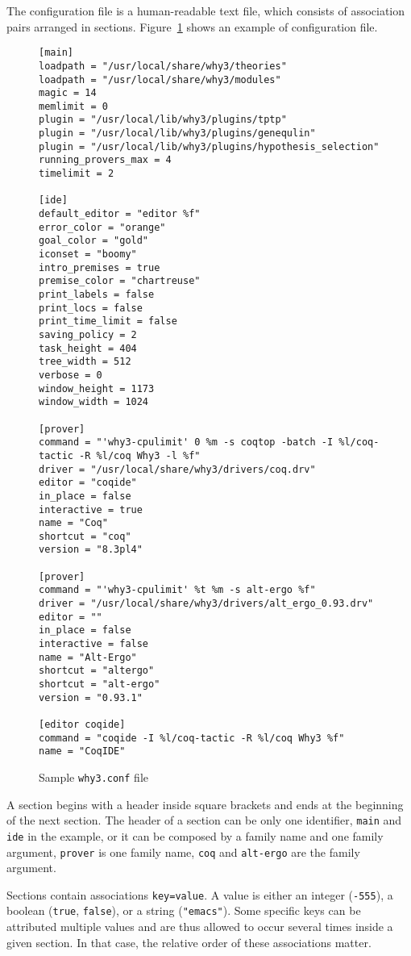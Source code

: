 The configuration file is a human-readable text file, which consists
of association pairs arranged in sections.
Figure~\ref{fig:why3conf} shows an example of configuration file.

\begin{figure}[p]
{\footnotesize
\begin{verbatim}
[main]
loadpath = "/usr/local/share/why3/theories"
loadpath = "/usr/local/share/why3/modules"
magic = 14
memlimit = 0
plugin = "/usr/local/lib/why3/plugins/tptp"
plugin = "/usr/local/lib/why3/plugins/genequlin"
plugin = "/usr/local/lib/why3/plugins/hypothesis_selection"
running_provers_max = 4
timelimit = 2

[ide]
default_editor = "editor %f"
error_color = "orange"
goal_color = "gold"
iconset = "boomy"
intro_premises = true
premise_color = "chartreuse"
print_labels = false
print_locs = false
print_time_limit = false
saving_policy = 2
task_height = 404
tree_width = 512
verbose = 0
window_height = 1173
window_width = 1024

[prover]
command = "'why3-cpulimit' 0 %m -s coqtop -batch -I %l/coq-tactic -R %l/coq Why3 -l %f"
driver = "/usr/local/share/why3/drivers/coq.drv"
editor = "coqide"
in_place = false
interactive = true
name = "Coq"
shortcut = "coq"
version = "8.3pl4"

[prover]
command = "'why3-cpulimit' %t %m -s alt-ergo %f"
driver = "/usr/local/share/why3/drivers/alt_ergo_0.93.drv"
editor = ""
in_place = false
interactive = false
name = "Alt-Ergo"
shortcut = "altergo"
shortcut = "alt-ergo"
version = "0.93.1"

[editor coqide]
command = "coqide -I %l/coq-tactic -R %l/coq Why3 %f"
name = "CoqIDE"
\end{verbatim}
}
\caption{Sample \texttt{why3.conf} file}
\label{fig:why3conf}
\end{figure}

A section begins with a header inside square brackets and ends at the
beginning of the next section. The header of a
section can be only one identifier, \texttt{main} and \texttt{ide} in
the example, or it can be composed by a family name and one family
argument, \texttt{prover} is one family name, \texttt{coq} and
\texttt{alt-ergo} are the family argument.

Sections contain associations \texttt{key=value}. A value is either
an integer (\eg \texttt{-555}), a boolean (\texttt{true}, \texttt{false}),
or a string (\eg \texttt{"emacs"}). Some specific keys can be attributed
multiple values and are
thus allowed to occur several times inside a given section. In that
case, the relative order of these associations matter.

